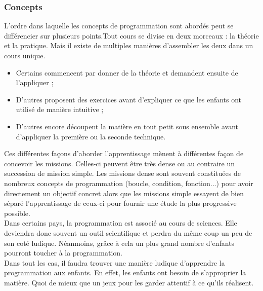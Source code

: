 \subsubsection{Concepts} 
L'ordre dans laquelle les concepts de programmation sont abordés peut se différencier sur plusieurs points.Tout cours se divise en deux morceaux : la théorie et la pratique. Mais il existe de multiples manières d'assembler les deux dans un cours unique.
\begin{itemize}
  \item Certains commencent par donner de la théorie et demandent ensuite de l'appliquer ;
  \item D'autres proposent des exercices avant d'expliquer ce que les enfants ont utilisé de manière intuitive ;
  \item D'autres encore découpent la matière en tout petit sous ensemble avant d'appliquer la première ou la seconde technique.\\
  \end{itemize}


Ces différentes façons d'aborder l'apprentissage mènent à différentes façon de concevoir les missions. Celles-ci peuvent être très dense ou au contraire un succession de mission simple. Les missions dense sont souvent constituées de nombreux concepts de programmation (boucle, condition, fonction...) pour avoir directement un objectif concret alors que les missions simple essayent de bien séparé l'apprentissage de ceux-ci pour fournir une étude la plus progressive possible.\\

Dans certains pays, la programmation est associé au cours de sciences. Elle deviendra donc souvent un outil scientifique et perdra du même coup un peu de son coté ludique. Néanmoins, grâce à cela un plus grand nombre d'enfants pourront toucher à la programmation.\\

Dans tout les cas, il faudra trouver une manière ludique d'apprendre la programmation aux enfants. En effet, les enfants ont besoin de s'approprier la matière. Quoi de mieux que un jeux pour les garder attentif à ce qu'ils réalisent.

